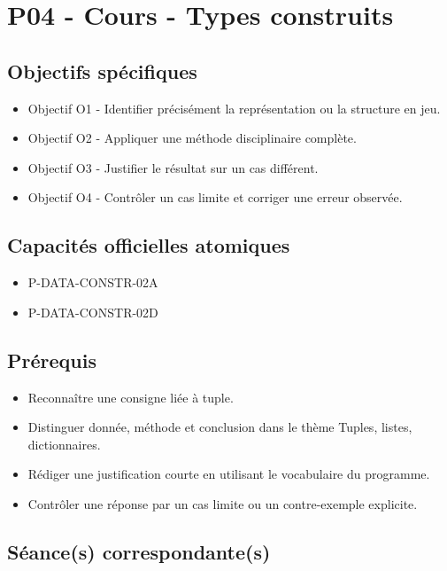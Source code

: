 \section{P04 - Cours - Types construits}

\subsection{Objectifs spécifiques}

\begin{itemize}
\tightlist
\item
  Objectif O1 - Identifier précisément la représentation ou la structure
  en jeu.
\item
  Objectif O2 - Appliquer une méthode disciplinaire complète.
\item
  Objectif O3 - Justifier le résultat sur un cas différent.
\item
  Objectif O4 - Contrôler un cas limite et corriger une erreur observée.
\end{itemize}

\subsection{Capacités officielles atomiques}

\begin{itemize}
\tightlist
\item
  P-DATA-CONSTR-02A
\item
  P-DATA-CONSTR-02D
\end{itemize}

\subsection{Prérequis}

\begin{itemize}
\tightlist
\item
  Reconnaître une consigne liée à tuple.
\item
  Distinguer donnée, méthode et conclusion dans le thème Tuples, listes,
  dictionnaires.
\item
  Rédiger une justification courte en utilisant le vocabulaire du
  programme.
\item
  Contrôler une réponse par un cas limite ou un contre-exemple
  explicite.
\end{itemize}

\subsection{Séance(s) correspondante(s)}

